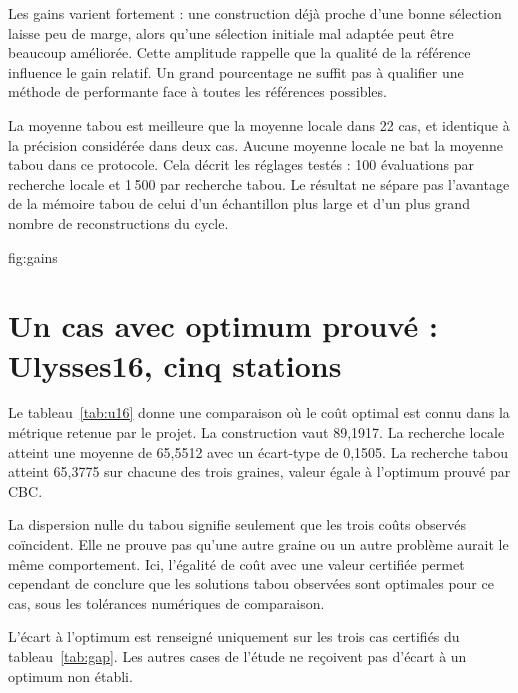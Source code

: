 Les gains varient fortement : une construction déjà proche d'une bonne
sélection laisse peu de marge, alors qu'une sélection initiale mal adaptée
peut être beaucoup améliorée. Cette amplitude rappelle que la qualité de la
référence influence le gain relatif. Un grand pourcentage ne suffit pas à
qualifier une méthode de performante face à toutes les références possibles.

La moyenne tabou est meilleure que la moyenne locale dans 22 cas, et identique
à la précision considérée dans deux cas. Aucune moyenne locale ne bat la
moyenne tabou dans ce protocole. Cela décrit les réglages testés : 100
évaluations par recherche locale et 1\,500 par recherche tabou. Le résultat
ne sépare pas l'avantage de la mémoire tabou de celui d'un échantillon plus
large et d'un plus grand nombre de reconstructions du cycle.

{fig:gains}
\FloatBarrier

\section{Un cas avec optimum prouvé : Ulysses16, cinq stations}
Le tableau~\ref{tab:u16} donne une comparaison où le coût optimal est connu
dans la métrique retenue par le projet. La construction vaut 89,1917.
La recherche locale atteint une moyenne de 65,5512 avec un écart-type de
0,1505. La recherche tabou atteint 65,3775 sur chacune des trois graines,
valeur égale à l'optimum prouvé par CBC.
\begin{table}[htbp]\centering
{\small\setlength{\tabcolsep}{4pt}}
\caption{Ulysses16, $p=5$, $\alpha=1$ : coût, dispersion et écart à l'optimum prouvé.}
\label{tab:u16}\sourcetable
\end{table}

La dispersion nulle du tabou signifie seulement que les trois coûts observés
coïncident. Elle ne prouve pas qu'une autre graine ou un autre problème aurait
le même comportement. Ici, l'égalité de coût avec une valeur certifiée permet
cependant de conclure que les solutions tabou observées sont optimales pour
ce cas, sous les tolérances numériques de comparaison.

L'écart à l'optimum est renseigné uniquement sur les trois cas certifiés du
tableau~\ref{tab:gap}. Les autres cases de l'étude ne reçoivent pas d'écart
à un optimum non établi.
\begin{table}[htbp]\centering

\caption{Écarts de coût moyen aux optima prouvés disponibles.}
\label{tab:gap}\sourcetable
\end{table}

